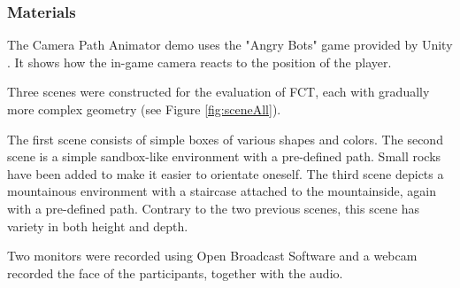 \subsubsection{Materials}
The Camera Path Animator \cite{unity_camTool} demo uses the "Angry Bots" game provided by Unity \cite{angryBots}. It shows how the in-game camera reacts to the position of the player.


Three scenes were constructed for the evaluation of FCT, each with gradually more complex geometry (see Figure \ref{fig:sceneAll}). 

The first scene consists of simple boxes of various shapes and colors.
The second scene is a simple sandbox-like environment with a pre-defined path. Small rocks have been added to make it easier to orientate oneself.
The third scene depicts a mountainous environment with a staircase attached to the mountainside, again with a pre-defined path. Contrary to the two previous scenes, this scene has variety in both height and depth.


Two monitors were recorded using Open Broadcast Software \cite{obs_cam} and a webcam recorded the face of the participants, together with the audio.

